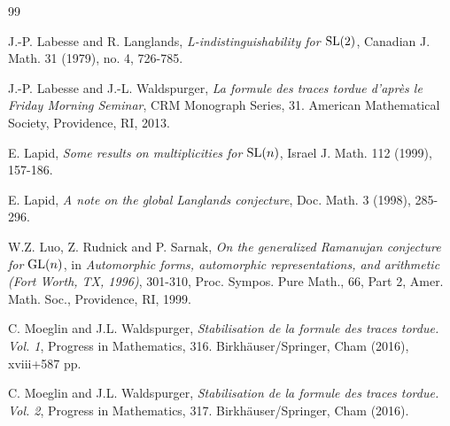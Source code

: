 \documentclass[11pt]{amsart}
\theoremstyle{plain}
\numberwithin{equation}{section}
\def\SL{{\rm SL}}
\def\GL{{\rm GL}}
\begin{document}
\begin{thebibliography}{99}

 


  J.-P. Labesse and R. Langlands, {\em L-indistinguishability for $\SL(2)$}, Canadian J. Math. 31 (1979), no. 4, 726-785. 

 J.-P. Labesse and  J.-L. Waldspurger, {\em  La formule des traces tordue d'apr\`es le Friday Morning Seminar},   CRM Monograph Series, 31. American Mathematical Society, Providence, RI, 2013. 

 E. Lapid, {\em Some results on multiplicities for $\SL(n)$},  Israel J. Math. 112 (1999), 157-186.

 E. Lapid, {\em  A note on the global Langlands conjecture},  Doc. Math. 3 (1998), 285-296. 



 W.Z. Luo, Z. Rudnick and P. Sarnak, {\em On the generalized Ramanujan conjecture for $\GL(n)$},  in {\em Automorphic forms, automorphic representations, and arithmetic (Fort Worth, TX, 1996)}, 301-310, Proc. Sympos. Pure Math., 66, Part 2, Amer. Math. Soc., Providence, RI, 1999. 

 C. Moeglin and J.L. Waldspurger,
{\em Stabilisation de la formule des traces tordue. Vol. 1},  Progress in Mathematics, 316. Birkh\"auser/Springer, Cham (2016), xviii+587 pp.

 C. Moeglin and J.L. Waldspurger,
{\em Stabilisation de la formule des traces tordue. Vol. 2},  Progress in Mathematics, 317. Birkh\"auser/Springer, Cham (2016).



\end{thebibliography}
\end{document}
